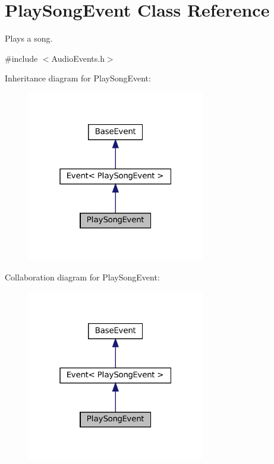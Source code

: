 \hypertarget{classPlaySongEvent}{}\section{Play\+Song\+Event Class Reference}
\label{classPlaySongEvent}


Plays a song.  




{\ttfamily \#include $<$Audio\+Events.\+h$>$}



Inheritance diagram for Play\+Song\+Event\+:\nopagebreak
\begin{figure}[H]
\begin{center}
\leavevmode
\includegraphics[width=220pt]{classPlaySongEvent__inherit__graph}
\end{center}
\end{figure}


Collaboration diagram for Play\+Song\+Event\+:\nopagebreak
\begin{figure}[H]
\begin{center}
\leavevmode
\includegraphics[width=220pt]{classPlaySongEvent__coll__graph}
\end{center}
\end{figure}
